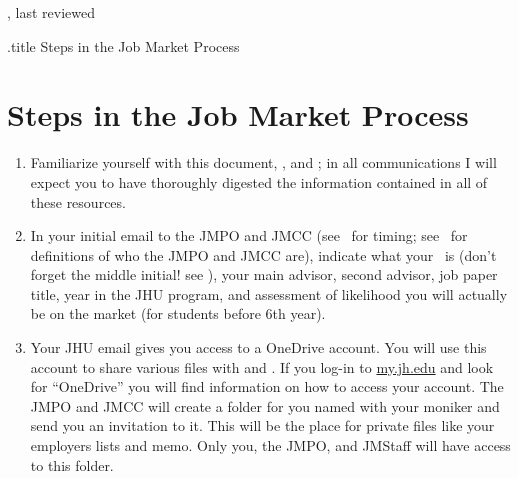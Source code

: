\documentclass{\classes/econtex}
\begin{document}
\hfill{\tiny \jobname, last reviewed \lastreviewedSteps} \vspace{0.1in}

\begin{verbatimwrite}{\jobname.title}
  Steps in the Job Market Process
\end{verbatimwrite}

\section*{\Large Steps in the Job Market Process}\medskip\medskip

\begin{enumerate}
\item Familiarize yourself with this document, \timet, and \faq; in all communications I will expect you
  to have thoroughly digested the information contained in all of these resources.

\item In your initial email to the JMPO and JMCC (see \timet~for timing; see \ntn~for definitions of who the JMPO and JMCC are), indicate what your \Moniker~is (don't forget the middle initial!  see \Notation), your main advisor, second advisor, job paper title,
  year in the JHU program, and assessment of likelihood you will
  actually be on the market (for students before 6th year).
  
  \hypertarget{OneDrive}{}
\item Your JHU email gives you access to a OneDrive account. You will use this account to share various files with {\JMStaff} and {\JMPO}. If you log-in to \href{https://my.jh.edu}{my.jh.edu} and look for ``OneDrive'' you will find information on how to access your account. The JMPO and JMCC will create a folder for you named with your moniker and send you an invitation to it. This will be the place for private files like your employers lists and memo. Only you, the JMPO, and JMStaff will have access to this folder.


\end{enumerate}
\end{document}
